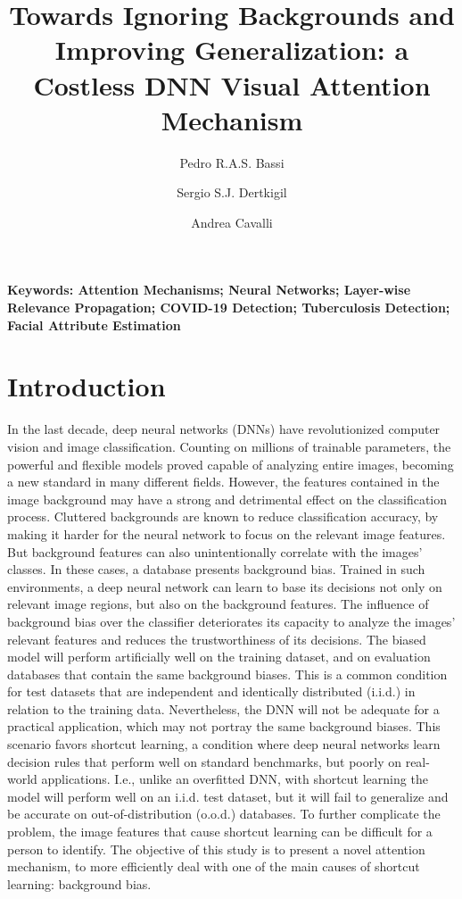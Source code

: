 \documentclass[fleqn,10pt]{wlscirep}
\title{Towards Ignoring Backgrounds and Improving Generalization: a Costless DNN Visual Attention Mechanism}
\author[1,2,*]{Pedro R.A.S. Bassi}
\author[3]{Sergio S.J. Dertkigil}
\author[1,2,*]{Andrea Cavalli}
\affil[1]{Alma Mater Studiorum - University of Bologna, Bologna, Italy}
\affil[2]{Istituto Italiano di Tecnologia, Genova, Italy}
\affil[3]{School of Medical Sciences, University of Campinas, Campinas, Brazil}
\affil[*]{e-mail: pedro.salvadorbassi2@unibo.it, andrea.cavalli@unibo.it}
\begin{document}
\flushbottom
\maketitle

\thispagestyle{empty}

\noindent \textbf{Keywords: Attention Mechanisms; Neural Networks; Layer-wise Relevance Propagation; COVID-19 Detection; Tuberculosis Detection; Facial Attribute Estimation}

\section{Introduction}

In the last decade, deep neural networks (DNNs) have revolutionized computer vision and image classification. Counting on millions of trainable parameters, the powerful and flexible models proved capable of analyzing entire images, becoming a new standard in many different fields. However, the features contained in the image background may have a strong and detrimental effect on the classification process. Cluttered backgrounds are known to reduce classification accuracy, by making it harder for the neural network to focus on the relevant image features. But background features can also unintentionally correlate with the images' classes. In these cases, a database presents background bias. Trained in such environments, a deep neural network can learn to base its decisions not only on relevant image regions, but also on the background features. The influence of background bias over the classifier deteriorates its capacity to analyze the images' relevant features and reduces the trustworthiness of its decisions. The biased model will perform artificially well on the training dataset, and on evaluation databases that contain the same background biases. This is a common condition for test datasets that are independent and identically distributed (i.i.d.) in relation to the training data. Nevertheless, the DNN will not be adequate for a practical application, which may not portray the same background biases. This scenario favors shortcut learning\cite{ShortcutLearning}, a condition where deep neural networks learn decision rules that perform well on standard benchmarks, but poorly on real-world applications. I.e., unlike an overfitted DNN, with shortcut learning the model will perform well on an i.i.d. test dataset, but it will fail to generalize and be accurate on out-of-distribution (o.o.d.) databases. To further complicate the problem, the image features that cause shortcut learning can be difficult for a person to identify\cite{ShortcutLearning}. The objective of this study is to present a novel attention mechanism, to more efficiently deal with one of the main causes of shortcut learning: background bias.
\end{document}

